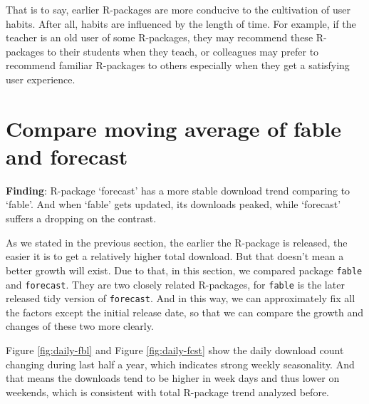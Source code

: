 \documentclass[
]{book}
\newenvironment{discovery}[1]{%
  \begin{tcolorbox}[colback=blue!30,colframe=blue!80!black]#1}{\end{tcolorbox}}
\begin{document}
That is to say, earlier R-packages are more conducive to the cultivation of user habits. After all, habits are influenced by the length of time. For example, if the teacher is an old user of some R-packages, they may recommend these R-packages to their students when they teach, or colleagues may prefer to recommend familiar R-packages to others especially when they get a satisfying user experience.

\hypertarget{compare-moving-average-of-fable-and-forecast}{%
\section{Compare moving average of fable and forecast}\label{compare-moving-average-of-fable-and-forecast}}

\begin{discovery}
\textbf{Finding}: R-package `forecast' has a more stable download trend
comparing to `fable'. And when `fable' gets updated, its downloads
peaked, while `forecast' suffers a dropping on the contrast.
\end{discovery}

As we stated in the previous section, the earlier the R-package is released, the easier it is to get a relatively higher total download. But that doesn't mean a better growth will exist. Due to that, in this section, we compared package \texttt{fable} and \texttt{forecast}. They are two closely related R-packages, for \texttt{fable} is the later released tidy version of \texttt{forecast}. And in this way, we can approximately fix all the factors except the initial release date, so that we can compare the growth and changes of these two more clearly.

Figure \ref{fig:daily-fbl} and Figure \ref{fig:daily-fcst} show the daily download count changing during last half a year, which indicates strong weekly seasonality. And that means the downloads tend to be higher in week days and thus lower on weekends, which is consistent with total R-package trend analyzed before.
\end{document}
